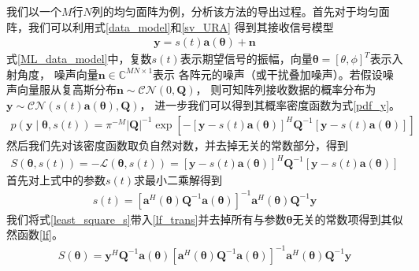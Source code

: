 \documentclass[master]{thesis-uestc}
\begin{document}
我们以一个$M$行$N$列的均匀面阵为例，分析该方法的导出过程。首先对于均匀面阵，我们可以利用式\eqref{data_model}和\eqref{sv_URA}
得到其接收信号模型
\begin{equation}\label{ML_data_model}
    \begin{aligned}
        \bm{y} = s(t)\bm{a}(\bm{\theta}) + \bm{n}
    \end{aligned}
\end{equation}
式\eqref{ML_data_model}中，复数$s(t)$表示期望信号的振幅，向量$\bm{\theta}=\left[\theta,\phi\right]^T$表示入射角度，
噪声向量$\bm{n}\in\mathbb{C}^{MN\times1}$表示
各阵元的噪声（或干扰叠加噪声）。若假设噪声向量服从复高斯分布$\bm{n}\sim\mathcal{CN}\left(0,\bm{Q}\right)$， 
则可知阵列接收数据的概率分布为$\bm{y}\sim\mathcal{CN}\left(s(t)\bm{a}(\bm{\theta}),\bm{Q}\right)$，
进一步我们可以得到其概率密度函数为式\eqref{pdf_y}。
\begin{equation}\label{pdf_y}
    \begin{aligned}
        p(\bm{y} \mid \bm{\theta}, s(t))=\pi^{-M}|\bm{Q}|^{-1} 
        \exp \left[-[\bm{y}-s(t) \bm{a}(\bm{\theta})]^{H} \bm{Q}^{-1}[\bm{y}-s(t) \bm{a}(\bm{\theta})]\right]
    \end{aligned}
\end{equation}
然后我们先对该密度函数取负自然对数，并去掉无关的常数部分，得到
\begin{equation}\label{lf_trans}
    \begin{aligned}
        S(\bm{\theta}, s(t))=-\mathcal{L}(\bm{\theta}, s(t))
        =[\bm{y}-s(t) \bm{a}(\bm{\theta})]^{H} \bm{Q}^{-1}[\bm{y}-s(t) \bm{a}(\bm{\theta})]
    \end{aligned}
\end{equation}
首先对上式中的参数$s(t)$求最小二乘解得到
\begin{equation}\label{least_square_s}
    \begin{aligned}
        s(t)=\left[\bm{a}^{H}(\bm{\theta}) \bm{Q}^{-1} \bm{a}(\bm{\theta})\right]^{-1} 
        \bm{a}^{H}(\bm{\theta}) \bm{Q}^{-1} \bm{y}
    \end{aligned}
\end{equation}
我们将式\eqref{least_square_s}带入\eqref{lf_trans}并去掉所有与参数$\bm{\theta}$无关的常数项得到其似然函数\eqref{lf}。
\begin{equation}\label{lf}
    \begin{aligned}
        S(\bm{\theta})=\bm{y}^{H} \bm{Q}^{-1} \bm{a}(\bm{\theta})
        \left[\bm{a}^{H}(\bm{\theta}) \bm{Q}^{-1} \bm{a}(\bm{\theta})\right]^{-1} 
        \bm{a}^{H}(\bm{\theta}) \bm{Q}^{-1} \bm{y}
    \end{aligned}
\end{equation}
\end{document}

